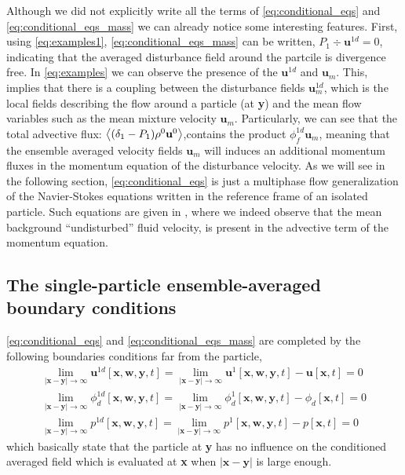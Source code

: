 Although we did not explicitly write all the terms of \ref{eq:conditional_eqs} and \ref{eq:conditional_eqs_mass} we can already notice some interesting features. 
First, using \ref{eq:examples1},  \ref{eq:conditional_eqs_mass} can be written, $P_1 \div \textbf{u}^{1d} =0$, indicating that the averaged disturbance field around the partcile is divergence free.  
In \ref{eq:examples} we can observe the presence of the $\textbf{u}^{1d}$ and $\textbf{u}_m$. 
This, implies that there is a coupling between the disturbance fields $\textbf{u}^{1d}_m$, which is the local fields describing the flow around a particle (at \textbf{y}) and the mean flow variables such as the mean mixture velocity $\textbf{u}_m$.
Particularly, we can see that the total advective flux: $\left<(\delta_1 - P_1)\rho^0 \textbf{u}^0\right>$,contains the product $\phi_f^{1d} \textbf{u}_m$, meaning that the ensemble averaged velocity fields $\textbf{u}_m$ will induces an additional momentum fluxes in the momentum equation of the disturbance velocity. 
As we will see in the following section, \ref{eq:conditional_eqs} is just a multiphase flow generalization of the Navier-Stokes equations written in the reference frame of an isolated particle.
Such equations are given in \citep{maxey1983equation}, where we indeed observe that the mean background ``undisturbed'' fluid velocity, is present in the advective term of the momentum equation. 

\subsection{The single-particle ensemble-averaged boundary conditions}


\ref{eq:conditional_eqs} and \ref{eq:conditional_eqs_mass} are completed by the following boundaries conditions far from the particle, 
\begin{align}
    \lim_{|\textbf{x}-\textbf{y}|\to\infty} 
    \textbf{u}^{1d}[\textbf{x},\textbf{w},\textbf{y},t] 
    = 
    \lim_{|\textbf{x}-\textbf{y}|\to\infty} 
    \textbf{u}^{1}[\textbf{x},\textbf{w},\textbf{y},t] 
    - \textbf{u}[\textbf{x},t] 
    = 0 \\
    \lim_{|\textbf{x}-\textbf{y}|\to\infty} 
    \phi_d^{1d}[\textbf{x},\textbf{w},\textbf{y},t] 
    = 
    \lim_{|\textbf{x}-\textbf{y}|\to\infty} 
    \phi_d^{1}[\textbf{x},\textbf{w},\textbf{y},t] 
    - \phi_d[\textbf{x},t] 
    = 0 \\
    \lim_{|\textbf{x}-\textbf{y}|\to\infty} 
    p^{1d}[\textbf{x},\textbf{w},\textbf{y},t] 
    = 
    \lim_{|\textbf{x}-\textbf{y}|\to\infty} 
    p^{1}[\textbf{x},\textbf{w},\textbf{y},t] 
    - p[\textbf{x},t] 
    = 0 
    \label{eq:boundary_at_infinity}
\end{align}
which basically state that the particle at \textbf{y} has no influence on the conditioned averaged field which is evaluated at \textbf{x} when $|\textbf{x}-\textbf{y}|$ is large enough. 

